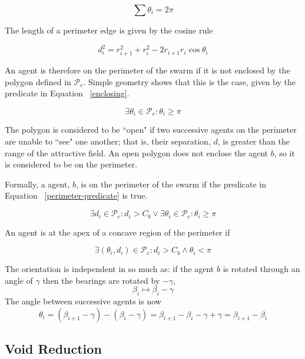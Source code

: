 \documentclass[letterpaper]{article}
\begin{document}
\begin{equation}
	\sum\theta_i = 2\pi
\end{equation}

The length of a perimeter edge is given by the cosine rule

\begin{equation}
	d_i^2 = r_{i+1}^2 + r_i^2 -2r_{i+1}r_i \cos\theta_i
\end{equation}

An agent is therefore on the perimeter of the swarm if it is not enclosed by the polygon defined in $\mathcal{P}_e$.  Simple geometry shows that this is the case, given by the predicate in Equation ~\ref{enclosing}.

\begin{equation}
	\exists \theta_i \in \mathcal{P}_e : \theta_i\geq\pi
	\label{enclosing}
\end{equation}

The polygon is considered to be ``open" if two successive agents on the perimeter are unable to ``see" one another; that is, their separation, $d$, is greater than the range of the attractive field.  An open polygon does not enclose the agent $b$, so it is considered to be on the perimeter. 

Formally, a agent, $b$, is on the perimeter of the swarm if the predicate in Equation ~\ref{perimeter-predicate} is true.

\begin{equation}
	\exists d_i\in\mathcal{P}_e:d_i>C_b \vee
	\exists\theta_i\in\mathcal{P}_e:\theta_i\geq\pi
	\label{perimeter-predicate}
\end{equation}

An agent is at the apex of a concave region of the perimeter if

\begin{equation}
	\exists(\theta_i,d_i)\in\mathcal{P}_e : d_i>C_b\wedge\theta_i<\pi
	\label{concave-predicate}
\end{equation}

The orientation is independent in so much as: if the agent $b$ is rotated through an angle of $\gamma$ then the bearings are rotated by $-\gamma$, \[ \beta_i\mapsto\beta_i-\gamma \] The  angle between successive agents is now
\[
	\theta_i  =  (\beta_{i+1}-\gamma) - (\beta_i-\gamma)
	 = \beta_{i+1}-\beta_i-\gamma+\gamma
	 = \beta_{i+1}-\beta_i
\]

\subsection{Void Reduction}
\end{document}

